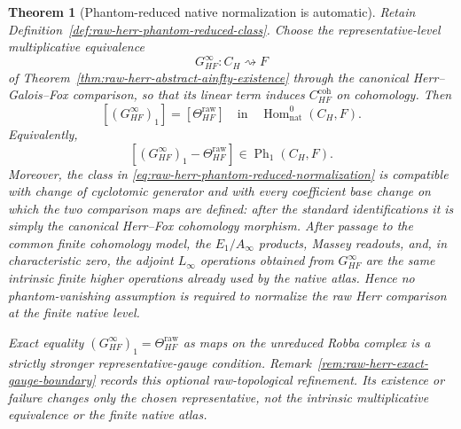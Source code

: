 \documentclass[11pt]{article}
\newtheorem{theorem}{Theorem}[section]
\theoremstyle{definition}
\begin{document}
\begin{theorem}[Phantom-reduced native normalization is automatic]\label{thm:raw-herr-phantom-reduced-normalization}
Retain Definition~\ref{def:raw-herr-phantom-reduced-class}.  Choose the
representative-level multiplicative equivalence
\[
 G_{HF}^\infty:C_H\rightsquigarrow F
\]
of Theorem~\ref{thm:raw-herr-abstract-ainfty-existence} through the canonical
Herr--Galois--Fox comparison, so that its linear term induces
$C_{HF}^{\mathrm{coh}}$ on cohomology.  Then
\begin{equation}\label{eq:raw-herr-phantom-reduced-normalization}
 \boxed{
 [(G_{HF}^\infty)_1]
 =
 [\Theta_{HF}^{\mathrm{raw}}]
 \quad\text{in}\quad
 \operatorname{Hom}^0_{\mathrm{nat}}(C_H,F).}
\end{equation}
Equivalently,
\begin{equation}\label{eq:raw-herr-linear-difference-phantom}
 [(G_{HF}^\infty)_1-\Theta_{HF}^{\mathrm{raw}}]
 \in\operatorname{Ph}_1(C_H,F).
\end{equation}
Moreover, the class in
\eqref{eq:raw-herr-phantom-reduced-normalization} is compatible with change of
cyclotomic generator and with every coefficient base change on which the two
comparison maps are defined: after the standard identifications it is simply the
canonical Herr--Fox cohomology morphism.  After passage to the common finite
cohomology model, the $E_1/A_\infty$ products, Massey readouts, and, in
characteristic zero, the adjoint $L_\infty$ operations obtained from
$G_{HF}^\infty$ are the same intrinsic finite higher operations already used by
the native atlas.  Hence no phantom-vanishing assumption is required to
normalize the raw Herr comparison at the finite native level.

Exact equality $(G_{HF}^\infty)_1=\Theta_{HF}^{\mathrm{raw}}$ as maps on the unreduced Robba complex is a strictly stronger representative-gauge condition.  Remark~\ref{rem:raw-herr-exact-gauge-boundary} records this optional raw-topological refinement.  Its existence or failure changes only the chosen representative, not the intrinsic multiplicative equivalence or the finite native atlas.
\end{theorem}
\end{document}
